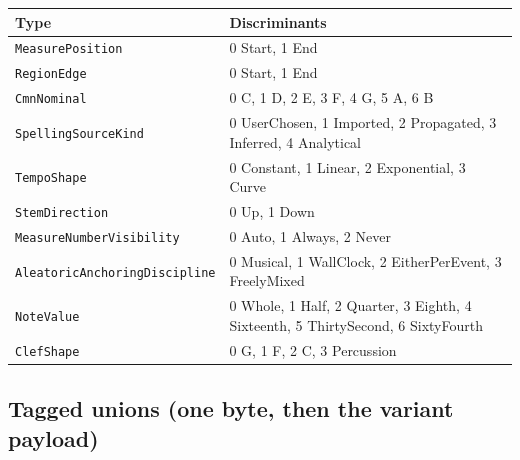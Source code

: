 \documentclass[11pt,letterpaper]{report}
\newcommand{\tablenums}[1]{{\addfontfeatures{Numbers={Lining,Tabular}}#1}}
\begin{document}
\begingroup\small
\begin{longtable}{p{1.9in} p{3.7in}}
  \toprule
  \textbf{Type} & \textbf{Discriminants} \\
  \midrule
  \endhead
  \texttt{MeasurePosition} & \tablenums{0} Start, \tablenums{1} End \\
  \texttt{RegionEdge} & \tablenums{0} Start, \tablenums{1} End \\
  \texttt{CmnNominal} & \tablenums{0} C, \tablenums{1} D, \tablenums{2} E,
    \tablenums{3} F, \tablenums{4} G, \tablenums{5} A, \tablenums{6} B \\
  \texttt{SpellingSourceKind} & \tablenums{0} UserChosen,
    \tablenums{1} Imported, \tablenums{2} Propagated, \tablenums{3} Inferred,
    \tablenums{4} Analytical \\
  \texttt{TempoShape} & \tablenums{0} Constant, \tablenums{1} Linear,
    \tablenums{2} Exponential, \tablenums{3} Curve \\
  \texttt{StemDirection} & \tablenums{0} Up, \tablenums{1} Down \\
  \texttt{MeasureNumberVisibility} & \tablenums{0} Auto,
    \tablenums{1} Always, \tablenums{2} Never \\
  \texttt{Aleatoric\allowbreak AnchoringDiscipline} & \tablenums{0} Musical,
    \tablenums{1} WallClock, \tablenums{2} EitherPerEvent,
    \tablenums{3} FreelyMixed \\
  \texttt{NoteValue} & \tablenums{0} Whole, \tablenums{1} Half,
    \tablenums{2} Quarter, \tablenums{3} Eighth, \tablenums{4} Sixteenth,
    \tablenums{5} ThirtySecond, \tablenums{6} SixtyFourth \\
  \texttt{ClefShape} & \tablenums{0} G, \tablenums{1} F, \tablenums{2} C,
    \tablenums{3} Percussion \\
  \bottomrule
\end{longtable}
\endgroup

\subsection{Tagged unions (one byte, then the variant payload)}
\end{document}
